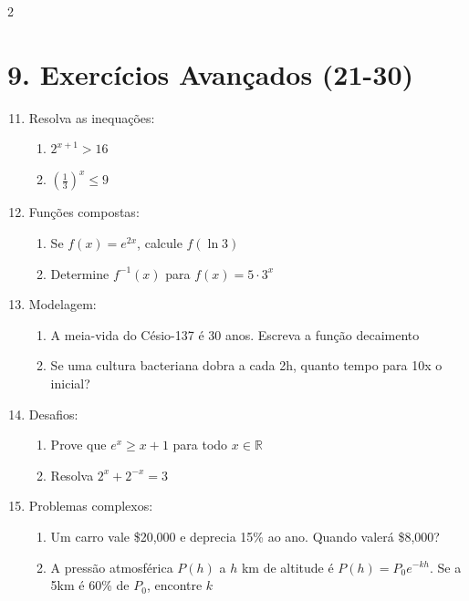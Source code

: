 \documentclass[11pt]{article}
\begin{document}
\begin{multicols}{2}
\section*{9. Exercícios Avançados (21-30)}
\begin{enumerate}\setcounter{enumi}{10}
    \item Resolva as inequações:
    \begin{enumerate}[label=\alph*)]
        \item $2^{x+1} > 16$
        \item $\left(\frac{1}{3}\right)^x \leq 9$
    \end{enumerate}
    
    \item Funções compostas:
    \begin{enumerate}[label=\alph*)]
        \item Se $f(x) = e^{2x}$, calcule $f(\ln 3)$
        \item Determine $f^{-1}(x)$ para $f(x) = 5 \cdot 3^x$
    \end{enumerate}
    
    \item Modelagem:
    \begin{enumerate}[label=\alph*)]
        \item A meia-vida do Césio-137 é 30 anos. Escreva a função decaimento
        \item Se uma cultura bacteriana dobra a cada 2h, quanto tempo para 10x o inicial?
    \end{enumerate}
    
    \item Desafios:
    \begin{enumerate}[label=\alph*)]
        \item Prove que $e^x \geq x + 1$ para todo $x \in \mathbb{R}$
        \item Resolva $2^x + 2^{-x} = 3$
    \end{enumerate}
    
    \item Problemas complexos:
    \begin{enumerate}[label=\alph*)]
        \item Um carro vale \$20,000 e deprecia 15\% ao ano. Quando valerá \$8,000?
        \item A pressão atmosférica $P(h)$ a $h$ km de altitude é $P(h) = P_0 e^{-kh}$. Se a 5km é 60\% de $P_0$, encontre $k$
    \end{enumerate}
\end{enumerate}

\end{multicols}
\end{document}
